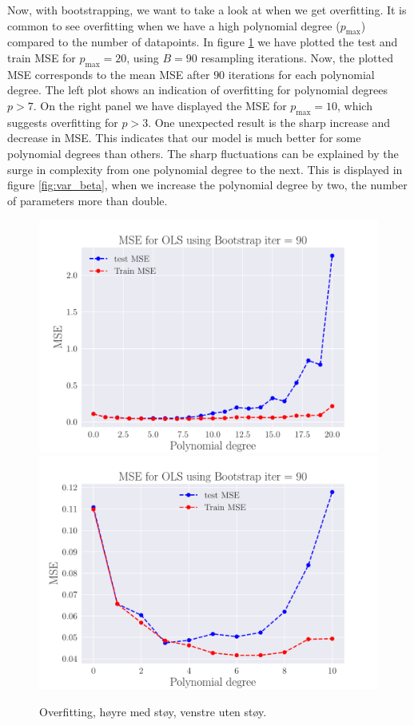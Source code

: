 \documentclass[reprint,english,notitlepage,aps,nobalancelastpage,nofootinbib]{revtex4-1}  %
\begin{document}
Now, with bootstrapping, we want to take a look at when we get overfitting. It is common to see overfitting when we have a high polynomial degree ($p_\text{max}$) compared to the number of datapoints. In figure \ref{fig:OLS_overfitting} we have plotted the test and train MSE for $p_\text{max} = 20$, using $B=90$ resampling iterations. Now, the plotted MSE corresponds to the mean MSE after $90$ iterations for each polynomial degree. The left plot shows an indication of overfitting for polynomial degrees $p > 7$. On the right panel we have displayed the MSE for $p_\text{max} = 10$, which suggests overfitting for $p>3$. One unexpected result is the sharp increase and decrease in MSE. This indicates that our model is much better for some polynomial degrees than others. The sharp fluctuations can be explained by the surge in complexity from one polynomial degree to the next. This is displayed in figure \ref{fig:var_beta}, when we increase the polynomial degree by two, the number of parameters more than double.

\begin{figure}[H]
	\includegraphics[width=\linewidth]{MSE_OLS_n30_eps02_pol20_Bootstrap_re90.pdf}
	\endminipage\hfill
	\includegraphics[width=\linewidth]{MSE_OLS_n30_eps02_pol10_Bootstrap_re90.pdf}
	\endminipage
	\caption{Overfitting, høyre med støy, venstre uten støy.}\label{fig:OLS_overfitting}
\end{figure}
\end{document}
